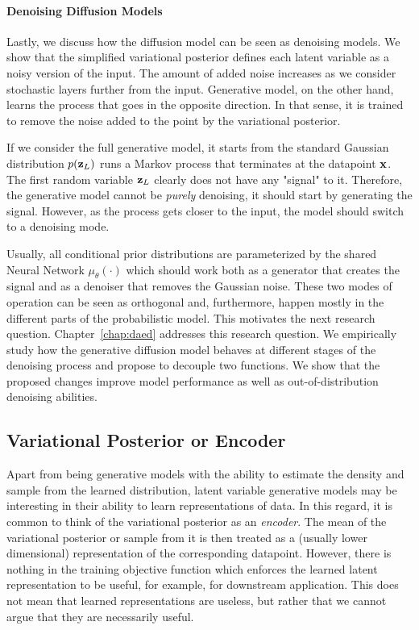 \paragraph{Denoising Diffusion Models}
Lastly, we discuss how the diffusion model can be seen as denoising models. We show that the simplified variational posterior defines each latent variable as a noisy version of the input. The amount of added noise increases as we consider stochastic layers further from the input. 
Generative model, on the other hand, learns the process that goes in the opposite direction. In that sense, it is trained to remove the noise added to the point by the variational posterior. 

If we consider the full generative model, it starts from the standard Gaussian distribution $p({\mathbf{z}}_L)$ runs a Markov process that terminates at the datapoint ${\mathbf{x}}$. The first random variable ${\mathbf{z}}_L$ clearly does not have any "signal" to it. Therefore, the generative model cannot be \textit{purely} denoising, it should start by generating the signal. However, as the process gets closer to the input, the model should switch to a denoising mode. 

Usually, all conditional prior distributions are parameterized by the shared Neural Network $\mu_{\theta}(\cdot)$ which should work both as a generator that creates the signal and as a denoiser that removes the Gaussian noise. These two modes of operation can be seen as orthogonal and, furthermore, happen mostly in the different parts of the probabilistic model. This motivates the next research question.
Chapter~\ref{chap:daed} addresses this research question.
We empirically study how the generative diffusion model behaves at different stages of the denoising process and propose to decouple two functions. We show that the proposed changes improve model performance as well as out-of-distribution denoising abilities. 

\subsection{Variational Posterior or Encoder}
Apart from being generative models with the ability to estimate the density and sample from the learned distribution, latent variable generative models may be interesting in their ability to learn representations of data. 
In this regard, it is common to think of the variational posterior as an \textit{encoder}. The mean of the variational posterior or sample from it is then treated as a (usually lower dimensional) representation of the corresponding datapoint. 
However, there is nothing in the training objective function which enforces the learned latent representation to be useful, for example, for downstream application. 
This does not mean that learned representations are useless, but rather that we cannot argue that they are necessarily useful. 

